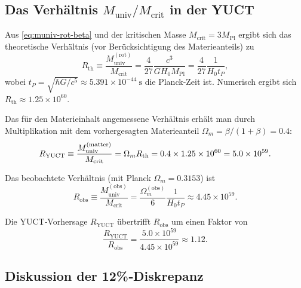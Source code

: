 \documentclass[11pt,a4paper]{article}
\begin{document}
	\subsection{Das Verhältnis \(M_{\mathrm{univ}} / M_{\mathrm{crit}}\) in der YUCT}
	
	Aus \eqref{eq:muniv-rot-beta} und der kritischen Masse \(M_{\mathrm{crit}} = 3 M_{\mathrm{Pl}}\) ergibt sich das theoretische Verhältnis (vor Berücksichtigung des Materieanteils) zu
	\begin{equation}
		R_{\mathrm{th}} \equiv \frac{M_{\mathrm{univ}}^{\mathrm{(rot)}}}{M_{\mathrm{crit}}} = \frac{4}{27} \frac{c^3}{G H_0 M_{\mathrm{Pl}}} = \frac{4}{27} \frac{1}{H_0 t_P},
		\label{eq:Rth}
	\end{equation}
	wobei \(t_P = \sqrt{\hbar G / c^5} \approx 5.391\times 10^{-44}\ \mathrm{s}\) die Planck‑Zeit ist. Numerisch ergibt sich \(R_{\mathrm{th}} \approx 1.25\times 10^{60}\).
	
	Das für den Materieinhalt angemessene Verhältnis erhält man durch Multiplikation mit dem vorhergesagten Materieanteil \(\Omega_m = \beta/(1+\beta) = 0.4\):
	\begin{equation}
		\small
		R_{\mathrm{YUCT}} \equiv \frac{M_{\mathrm{univ}}^{\mathrm{(matter)}}}{M_{\mathrm{crit}}} = \Omega_m R_{\mathrm{th}} = 0.4 \times 1.25\times 10^{60} = 5.0\times 10^{59}.
		\label{eq:RYUCT}
	\end{equation}
	
	Das beobachtete Verhältnis (mit Planck \(\Omega_m = 0.3153\)) ist
	\begin{equation}
		R_{\mathrm{obs}} \equiv \frac{M_{\mathrm{univ}}^{\mathrm{(obs)}}}{M_{\mathrm{crit}}} = \frac{\Omega_m^{\mathrm{(obs)}}}{6} \frac{1}{H_0 t_P} \approx 4.45\times 10^{59}.
		\label{eq:Robs}
	\end{equation}
	
	Die YUCT‑Vorhersage \(R_{\mathrm{YUCT}}\) übertrifft \(R_{\mathrm{obs}}\) um einen Faktor von
	\[
	\frac{R_{\mathrm{YUCT}}}{R_{\mathrm{obs}}} = \frac{5.0\times 10^{59}}{4.45\times 10^{59}} \approx 1.12.
	\]
	
	\subsection{Diskussion der 12\%‑Diskrepanz}
	
\end{document}
